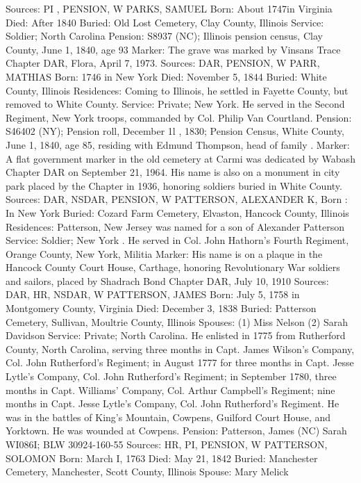 Sources: PI , PENSION, W 
PARKS, SAMUEL 
Born: About 1747in Virginia
Died: After 1840
Buried: Old Lost Cemetery, Clay County, Illinois 
Service: Soldier; North Carolina 
Pension: S8937 (NC); Illinois pension census, Clay County, June 1, 1840, age 93 
Marker: The grave was marked by Vinsans Trace Chapter DAR, Flora, April 7, 1973. 
Sources: DAR, PENSION, W 
PARR, MATHIAS 
Born: 1746 in New York 
Died: November 5, 1844 
Buried: White County, Illinois 
Residences: Coming to Illinois, he settled in Fayette County, but removed to White County. 
Service: Private; New York. He served in the Second Regiment, New York troops, commanded by Col. Philip Van Courtland. 
Pension: S46402 (NY); Pension roll, December 1l , 1830; Pension Census, White County, June 1, 1840, age 85, residing with Edmund Thompson, head of family . 
Marker: A flat government marker in the old cemetery at Carmi was dedicated by Wabash Chapter DAR on September 21, 1964. His name is also on a monument in city park placed by the Chapter in 1936, honoring soldiers buried in White County. 
Sources: DAR, NSDAR, PENSION, W 
PATTERSON, ALEXANDER K, 
Born : In New York
Buried: Cozard Farm Cemetery, Elvaston, Hancock County, Illinois
Residences: Patterson, New Jersey was named for a son of Alexander Patterson 
Service: Soldier; New York . He served in Col. John Hathorn's Fourth Regiment, Orange County, New York, Militia
Marker: His name is on a plaque in the Hancock County Court House, Carthage, honoring Revolutionary War soldiers and sailors, placed by Shadrach Bond Chapter DAR, July 10, 1910
Sources: DAR, HR, NSDAR, W 
PATTERSON, JAMES 
Born: July 5, 1758 in Montgomery County, Virginia 
Died: December 3, 1838 
Buried: Patterson Cemetery, Sullivan, Moultrie County, Illinois 
Spouses: (1) Miss Nelson
	 (2) Sarah Davidson
Service: Private; North Carolina. He enlisted in 1775 from Rutherford County, North Carolina, serving three months in Capt. James Wilson's Company, Col. John Rutherford's Regiment; in August 1777 for three months in Capt. Jesse Lytle's Company, Col. John Rutherford's Regiment; in September 1780, three months in Capt. Williams' Company, Col. Arthur Campbell's Regiment; nine months in Capt. Jesse Lytle's Company, Col. John Rutherford's Regiment. He was in the battles of King's Mountain, Cowpens, Guilford Court House, and Yorktown. He was wounded at Cowpens. 
Pension: Patterson, James (NC) Sarah WI086I; BLW 30924-160-55 
Sources: HR, PI, PENSION, W 
PATTERSON, SOLOMON 
Born: March I, 1763 
Died: May 21, 1842 
Buried: Manchester Cemetery, Manchester, Scott County, Illinois 
Spouse: Mary Melick 
